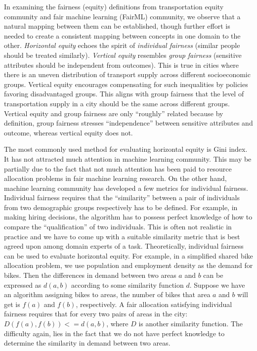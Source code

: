 \documentclass[11pt]{article}
\begin{document}
In examining the fairness (equity) definitions from transportation equity community and fair machine learning (FairML) community, we observe that a natural mapping between them can be established, though further effort is needed to create a consistent mapping between concepts in one domain to the other. \textit{Horizontal equity} echoes the spirit of \textit{individual fairness} (similar people should be treated similarly). \textit{Vertical equity} resembles \textit{group fairness} (sensitive attributes should be independent from outcomes). This is true in cities where there is an uneven distribution of transport supply across different socioeconomic groups. Vertical equity encourages compensating for such inequalities by policies favoring disadvantaged groups. This aligns with group fairness that the level of transportation supply in a city should be the same across different groups. Vertical equity and group fairness are only ``roughly'' related because by definition, group fairness stresses ``independence'' between sensitive attributes and outcome, whereas vertical equity does not.   


The most commonly used method for evaluating horizontal equity is Gini index. It has not attracted much attention in machine learning community. This may be partially due to the fact that not much attention has been paid to resource allocation problems in fair machine learning research. On the other hand, machine learning community has developed a few metrics for individual fairness. Individual fairness requires that the ``similarity'' between a pair of individuals from two demographic groups respectively has to be defined. For example, in making hiring decisions, the algorithm has to possess perfect knowledge of how to compare the ``qualification'' of two individuals. This is often not realistic in  practice and we have to come up with a suitable similarity metric that is best agreed upon among domain experts of a task. Theoretically, individual fairness can be used to evaluate horizontal equity. For example, in a simplified shared bike allocation problem, we use population and employment density as the demand for bikes. Then the differences in demand between two areas $a$ and $b$ can be expressed as $d(a, b)$ according to some similarity function $d$. Suppose we have an algorithm assigning bikes to areas, the number of bikes that area $a$ and $b$ will get is $f(a)$ and $f(b)$, respectively. A fair allocation satisfying individual fairness requires that for every two pairs of areas in the city: $D(f(a) , f(b)) <= d(a,b)$, where $D$ is another similarity function. The difficulty again, lies in the fact that we do not have perfect knowledge to determine the similarity in demand between two areas. 
\end{document}
